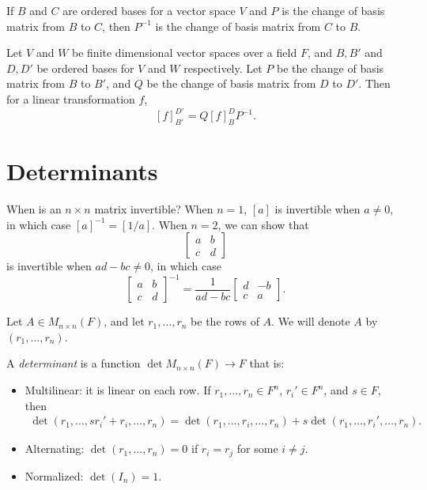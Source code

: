 \begin{lemma}
    If $B$ and $C$ are ordered bases for a vector space $V$ and $P$ is the change of basis matrix from $B$ to $C$, then $P^{-1}$ is the change of basis matrix from $C$ to $B$.
\end{lemma}

\begin{thm}
    Let $V$ and $W$ be finite dimensional vector spaces over a field $F$, and $B, B'$ and $D, D'$ be ordered bases for $V$ and $W$ respectively. Let $P$ be the change of basis matrix from $B$ to $B'$, and $Q$ be the change of basis matrix from $D$ to $D'$. Then for a linear transformation $f$,
    \[[f]_{B'}^{D'} = Q[f]_{B}^{D}P^{-1}.\]
\end{thm}

\section{Determinants}

When is an $n \times n$ matrix invertible? When $n = 1$, $[a]$ is invertible when $a \neq 0$, in which case $[a]^{-1} = [1/a]$. When $n = 2$, we can show that
\[\begin{bmatrix}
    a & b \\
    c & d
\end{bmatrix}\] is invertible when $ad - bc \neq 0$, in which case
\[\begin{bmatrix}
    a & b \\
    c & d
\end{bmatrix}^{-1} = \frac{1}{ad - bc}\begin{bmatrix}
    d & -b \\
    c & a
\end{bmatrix}.\]

\begin{rmk}
    Let $A \in M_{n \times n}(F)$, and let $r_1, \ldots, r_n$ be the rows of $A$. We will denote $A$ by $(r_1, \ldots, r_n)$.
\end{rmk}

\begin{defn}\label{det-properties}
    A \emph{determinant} is a function $\det M_{n \times n}(F) \to F$ that is:
    \begin{itemize}
        \item Multilinear: it is linear on each row. If $r_1, \ldots, r_n \in F^n$, $r_i' \in F^n$, and $s \in F$, then
        \begin{align*}
            \det\left(r_1, \ldots, sr_i' + r_i, \ldots, r_n\right) = \det\left(r_1, \ldots, r_i, \ldots, r_n\right) + s\det\left(r_1, \ldots, r_i', \ldots, r_n\right).
        \end{align*}
        \item Alternating: $\det(r_1, \ldots, r_n) = 0$ if $r_i = r_j$ for some $i \neq j$.
        \item Normalized: $\det(I_n) = 1$.
    \end{itemize}
\end{defn}

